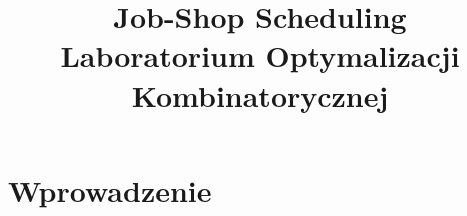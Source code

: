\documentclass[10pt,a4paper]{article}
\author{\authorthing}
\title{Job-Shop Scheduling\\Laboratorium Optymalizacji Kombinatorycznej}
\begin{document}
\maketitle
\section{Wprowadzenie}
\end{document}
